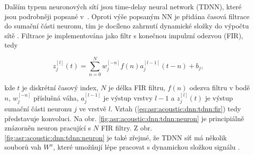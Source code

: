 Dalším typem neuronových sítí jsou time-delay neural network (TDNN), které jsou podrobněji popsané v~\cite{Waibel1989}. Oproti výše popsaným NN je přidána časová filtrace do sumační části neuronu, tím je docíleno zahrnutí dynamické složky do výpočtu sítě \cite{Craig2000}. Filtrace je implementována jako filtr s konečnou impulzní odezvou (FIR), tedy

\begin{equation}
  z_{j}^{[l]}\left(t\right) = \sum_{n=0}^{N} w_{j}^{[-n]}f\left(n\right)a^{[l-1]}_{j}\left(t - n\right) + b_{j},
  \label{eq:asr:acoustic:dnn:tdnn:fir}
\end{equation}

\noindent kde $t$ je diskrétní časový index, $N$ je délka FIR filtru, $f\left(n\right)$ odezva filtru v bodě $n$, $w_{j}^{[-n]}$ příslušná váha, $a^{[l-1]}_{j}$ je výstup vrstvy $l-1$ a $z_{j}^{[l]}\left(t\right)$ je výstup sumační části neuronu $j$ ve vrstvě $l$. Vztah (\ref{eq:asr:acoustic:dnn:tdnn:fir}) tedy představuje konvoluci. Na obr. \ref{fig:asr:acoustic:dnn:tdnn:neuron} je principiálně znázorněn neuron pracující s $N$ FIR filtry. Z obr. \ref{fig:asr:acoustic:dnn:tdnn:neuron} je také zřejmé, že TDNN síť má několik souborů vah $W^{x}$, které umožňují lépe pracovat s dynamickou složkou signálu \cite{Peddinti2015}.

